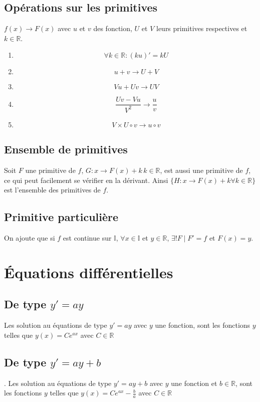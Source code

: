 \documentclass{article}
\begin{document}
\subsection{Opérations sur les primitives}
$f(x) \rightarrow F(x)$ avec $u$ et $v$ des fonction, $U$ et $V$ leurs primitives respectives et $k\in\mathbb{R}$.
\begin{enumerate}
	\item[] $$\forall k \in \mathbb{R} : (ku)' = kU$$
	\item[] $$u+v \rightarrow U + V$$
	\item[] $$Vu + Uv \rightarrow UV$$
	\item[] $$\frac{Uv-Vu}{V^2} \rightarrow \frac{u}{v}$$
	\item[] $$V \times U\circ v \rightarrow u\circ v$$
\end{enumerate}

\subsection{Ensemble de primitives}
Soit $F$ une primitive de $f$, $G: x\rightarrow F(x) + k\,k\in\mathbb{R}$, est aussi une primitive de $f$, ce qui peut facilement se vérifier en la dérivant. Ainsi $\{H: x\rightarrow F(x) + k \forall k\in\mathbb{R}\}$ est l'ensemble des primitives de $f$.
\subsection{Primitive particulière}
On ajoute que si $f$ est continue sur $\mathbb{I}$, $\forall x\in\mathbb{I}$ et $y\in\mathbb{R}$, $\exists ! F\mid F'=f$ et $F(x)=y$.

\section{Équations différentielles}
\subsection{De type $y'=ay$}
Les solution au équations de type $y'=ay$ avec $y$ une fonction, sont les fonctions $y$ telles que $y(x) = Ce^{ax}$ avec $C\in\mathbb{R}$
\subsection{De type $y'=ay+b$}.
Les solution au équations de type $y'=ay+b$ avec $y$ une fonction et $b\in\mathbb{R}$, sont les fonctions $y$ telles que $y(x) = Ce^{ax}-\frac{b}{a}$ avec $C\in\mathbb{R}$
\end{document}
